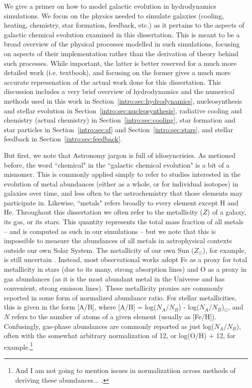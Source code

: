 We give a primer on how to model galactic evolution in hydrodynamics simulations. We focus on the physics needed to simulate galaxies (cooling, heating, chemistry, star formation, feedback, etc.) as it pertains to the aspects of galactic chemical evolution examined in this dissertation. This is meant to be a broad overview of the physical processes modelled in such simulations, focusing on aspects of their implementation rather than the derivation of theory behind such processes. While important, the latter is better reserved for a much more detailed work (i.e. textbook), and focusing on the former gives a much more accurate represenation of the actual work done for this dissertation. This discussion includes a very brief overview of hydrodynamics and the numerical methods used in this work in Section~\ref{intro:sec:hydrodynamics}, nucleosynthesis and stellar evolution in Section~\ref{intro:sec:nucleosynthesis}, radiative cooling and chemistry (actual chemistry) in Section~\ref{intro:sec:cooling}, star formation and star particles in Section~\ref{intro:sec:sf} and Section~\ref{intro:sec:stars}, and stellar feedback in Section~\ref{intro:sec:feedback}.

But first, we note that Astronomy jargon is full of idiosyncrisies. As metioned before, the word ``chemical" in the ``galactic chemical evolution" is a bit of a misnomer. This is commonly applied simply to refer to studies interested in the evolution of metal abundances (either as a whole, or for individual isotopes) in galaxies over time, and less often to the astrochemistry that those elements may participate in. Likewise, ``metals" refers broadly to every element except H and He. Throughout this dissertation we often refer to the metallicity ($Z$) of a galaxy, its gas, or its stars. This quantity represents the total mass fraction of all metals -- and is computed as such in our simulations -- but we note that this is impossible to measure the abundances of all metals in astrophysical contexts outside our own Solar System. The metallicity of our own Sun ($Z_{\odot}$), for example, is still uncertain \citep{Asplund2009}. Instead, most observational works adopt Fe as a proxy for total metallicity in stars (due to its many, strong absorption lines) and O as a proxy in gas abundances (as it is the most abundant metal in the Universe and has convenient, strong emisson lines). These metallicity proxies are commonly reported in some form of normalized abundance ratio. For stellar metallicities, this is given in the form [A/B], where [A/B] = log($N_A / N_B$) - log($N_A / N_B$)$_{\odot}$, and $N$ refers to the number of atoms of a given element (usually as [Fe/H]). Confusingly, gas-phase abundances are commonly reported as just log($N_A / N_B$), often with the somewhat arbitrary normalization of 12, or log(O/H) + 12, for example.\footnote{And I am not going to mention issues in normalizatiion across methods of deriving these abundances... \citep[e.g.][]{KewleyEllison2008}.} 

